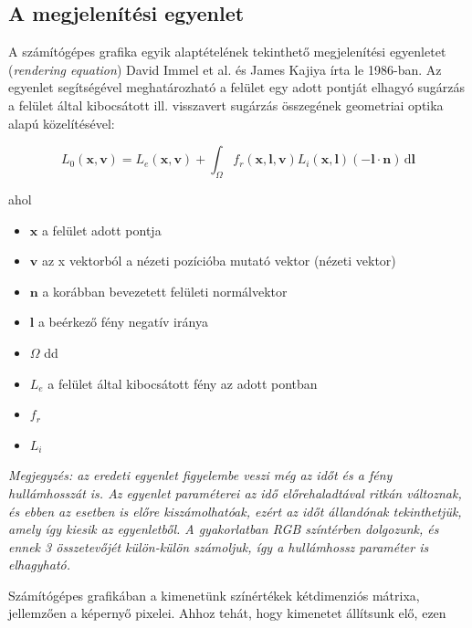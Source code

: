 \documentclass[12pt,oneside]{book}
\begin{document}
\subsection{A megjelenítési egyenlet}

A számítógépes grafika egyik alaptételének tekinthető megjelenítési egyenletet (\textit{rendering equation}) David Immel et al. és James Kajiya írta le 1986-ban. Az egyenlet segítségével meghatározható a felület egy adott pontját elhagyó sugárzás a felület által kibocsátott ill. visszavert sugárzás összegének geometriai optika alapú közelítésével:

\[
L_0(\mathbf{x},\mathbf{v}) = L_e(\mathbf{x},\mathbf{v}) + \int_\Omega f_r(\mathbf{x},\mathbf{l},\mathbf{v}) L_i(\mathbf{x},\mathbf{l}) (-\mathbf{l} \cdot \mathbf{n})\,\mathrm{d}\mathbf{l}
\]

ahol

\begin{itemize}[noitemsep]
\item \(\mathbf{x}\) a felület adott pontja
\item \(\mathbf{v}\) az x vektorból a nézeti pozícióba mutató vektor (nézeti vektor)
\item \(\mathbf{n}\) a korábban bevezetett felületi normálvektor
\item \(\mathbf{l}\) a beérkező fény negatív iránya
\item \(\Omega\) dd
\item \(L_e\) a felület által kibocsátott fény az adott pontban
\item \(f_r\) 
\item \(L_i\)
\end{itemize}

\textit{Megjegyzés: az eredeti egyenlet figyelembe veszi még az időt és a fény hullámhosszát is. Az egyenlet paraméterei az idő előrehaladtával ritkán változnak, és ebben az esetben is előre kiszámolhatóak, ezért az időt állandónak tekinthetjük, amely így kiesik az egyenletből. A gyakorlatban RGB színtérben dolgozunk, és ennek 3 összetevőjét külön-külön számoljuk, így a hullámhossz paraméter is elhagyható.}

Számítógépes grafikában a kimenetünk színértékek kétdimenziós mátrixa, jellemzően a képernyő pixelei. Ahhoz tehát, hogy kimenetet állítsunk elő, ezen
\end{document}
